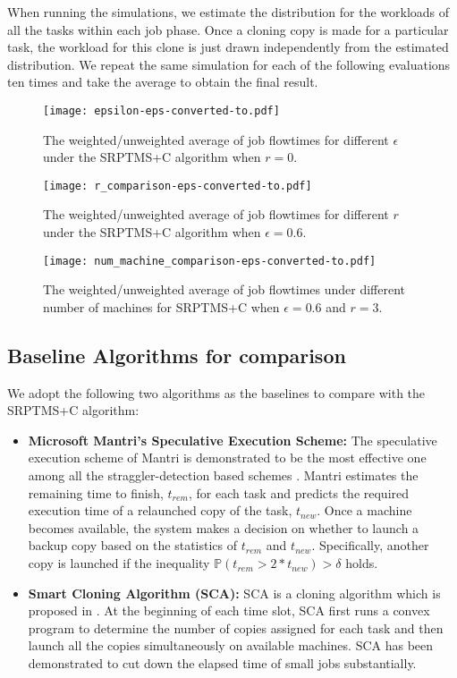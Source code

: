 \documentclass[10pt,conference,compsocconf,letterpaper]{IEEEtran}
\begin{document}
When running the simulations, we estimate the distribution for the workloads of all the tasks within each job phase. Once a cloning copy is made for a particular task, the workload for this clone is just drawn independently from the estimated distribution. We repeat the same simulation for each of the following evaluations ten times and take the
average to obtain the final result.

\begin{figure*}
\centering
\begin{minipage}{.32\textwidth}
\centering
\texttt{[image: epsilon-eps-converted-to.pdf]}
\caption{The weighted/unweighted average of job flowtimes for different $\epsilon$ under the SRPTMS+C algorithm when $r = 0$.}
\label{epsilon}
\end{minipage}\hfill
\begin{minipage}{.32\textwidth}
\centering
\texttt{[image: r\_comparison-eps-converted-to.pdf]}
\caption{The weighted/unweighted average of job flowtimes for different $r$ under the SRPTMS+C algorithm when $\epsilon = 0.6$.}
\label{r}
\end{minipage}\hfill
\begin{minipage}{.32\textwidth}
\centering
\texttt{[image: num\_machine\_comparison-eps-converted-to.pdf]}
\caption{The weighted/unweighted average of job flowtimes under different number of machines for SRPTMS+C when $\epsilon = 0.6$ and $r = 3$.}
\label{num}
\end{minipage}
\vspace{-0.8em}
\end{figure*}




\subsection{Baseline Algorithms for comparison}
We adopt the following two algorithms as the baselines to compare with the SRPTMS+C algorithm:

\begin{itemize}
\item \textbf{Microsoft Mantri's Speculative Execution Scheme:} The speculative execution scheme of Mantri is demonstrated to be the most effective one among all the straggler-detection based schemes \cite{Outliers}. Mantri estimates  the remaining time to finish, $t_{rem}$, for each task and predicts the required execution time of a relaunched copy of the task, $t_{new}$. Once a machine becomes available, the system makes a decision on whether to launch a backup copy based on the statistics of $t_{rem}$ and $t_{new}$. Specifically, another copy is launched if the inequality $\mathbb{P}(t_{rem}>2*t_{new}) > \delta$ holds.
\item \textbf{Smart Cloning Algorithm (SCA):} SCA is a cloning algorithm which is proposed in \cite{speculative-multiple-optimization}. At the beginning of each time slot, SCA first runs a convex program to determine the number of copies assigned for each task and then launch all the copies simultaneously on available machines.  SCA has been demonstrated to cut
down the elapsed time of small jobs substantially.\end{itemize}
\end{document}
